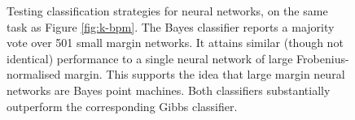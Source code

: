 \begin{refsection}
\begin{figure}[p]
    \caption[Testing classification strategies for neural networks]{Testing classification strategies for neural networks, on the same task as Figure \ref{fig:k-bpm}. The Bayes classifier reports a majority vote over 501 small margin networks. It attains similar (though not identical) performance to a single neural network of large Frobenius-normalised margin. This supports the idea that large margin neural networks are Bayes point machines. Both classifiers substantially outperform the corresponding Gibbs classifier.}
    \label{fig:nn-bpm}
\end{figure}

\printbibliography[heading=subbibliography]
\end{refsection}